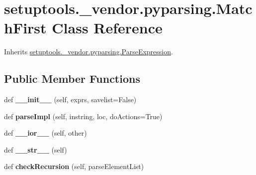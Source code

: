 \hypertarget{classsetuptools_1_1__vendor_1_1pyparsing_1_1_match_first}{}\section{setuptools.\+\_\+vendor.\+pyparsing.\+Match\+First Class Reference}
\label{classsetuptools_1_1__vendor_1_1pyparsing_1_1_match_first}


Inherits \hyperlink{classsetuptools_1_1__vendor_1_1pyparsing_1_1_parse_expression}{setuptools.\+\_\+vendor.\+pyparsing.\+Parse\+Expression}.

\subsection*{Public Member Functions}
\begin{DoxyCompactItemize}
\item 
\mbox{\label{classsetuptools_1_1__vendor_1_1pyparsing_1_1_match_first_a8c4b94a7f8d215b1318450837ca995a7}} 
def {\bfseries \+\_\+\+\_\+init\+\_\+\+\_\+} (self, exprs, savelist=False)
\item 
\mbox{\label{classsetuptools_1_1__vendor_1_1pyparsing_1_1_match_first_aeac5a3aa6b8289f092a5f4fc3036f19e}} 
def {\bfseries parse\+Impl} (self, instring, loc, do\+Actions=True)
\item 
\mbox{\label{classsetuptools_1_1__vendor_1_1pyparsing_1_1_match_first_a438540bf6ab18d10e6f87804e73a44cc}} 
def {\bfseries \+\_\+\+\_\+ior\+\_\+\+\_\+} (self, other)
\item 
\mbox{\label{classsetuptools_1_1__vendor_1_1pyparsing_1_1_match_first_a4f868d0c5588bc60bc515a1d2e137c9b}} 
def {\bfseries \+\_\+\+\_\+str\+\_\+\+\_\+} (self)
\item 
\mbox{\label{classsetuptools_1_1__vendor_1_1pyparsing_1_1_match_first_a5376c92c60f069f53e8ad95cebde5c79}} 
def {\bfseries check\+Recursion} (self, parse\+Element\+List)
\end{DoxyCompactItemize}
